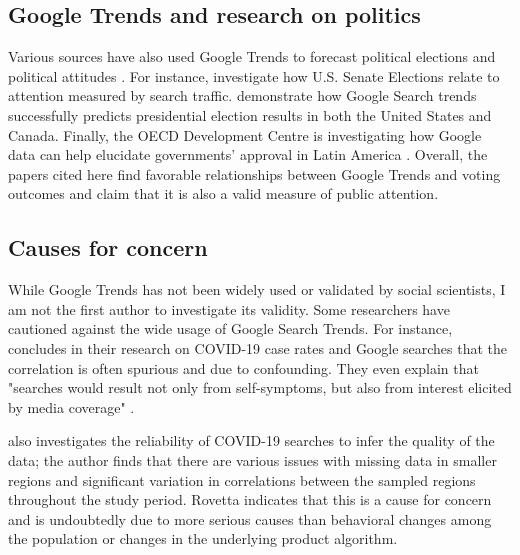 \subsection{Google Trends and research on politics}

Various sources have also used Google Trends to forecast political elections and
political attitudes \citep{wolfTrendingRightDirection2018}. For instance,
\citet{swearingenGoogleInsightsSenate2014} investigate how U.S. Senate Elections
relate to attention measured by search traffic.
\citet{pradoromanGoogleTrendsPredictor2020} demonstrate how Google Search trends
successfully predicts presidential election results in both the United States
and Canada. Finally, the OECD Development Centre is investigating how Google
data can help elucidate governments' approval in Latin America
\citep{montoyaUsingGoogleData2020}. Overall, the papers cited here find
favorable relationships between Google Trends and voting outcomes and claim that
it is also a valid measure of public attention.

\subsection{Causes for concern}

While Google Trends has not been widely used or validated by social scientists,
I am not the first author to investigate its validity. Some researchers have
cautioned against the wide usage of Google Search Trends. For instance,
\citet{asseoTrackingCOVID19Using2020} concludes in their research on COVID-19
case rates and Google searches that the correlation is often spurious and due to
confounding. They even explain that "searches would result not only from
self-symptoms, but also from interest elicited by media coverage"
\citep[][p.1]{asseoTrackingCOVID19Using2020}.

\citet{rovetta21} also investigates the reliability of COVID-19 searches to
infer the quality of the data; the author finds that there are various issues
with missing data in smaller regions and significant variation in correlations
between the sampled regions throughout the study period. Rovetta indicates that
this is a cause for concern and is undoubtedly due to more serious causes than
behavioral changes among the population or changes in the underlying product
algorithm.

